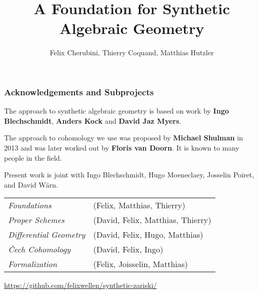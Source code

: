\documentclass{beamer}
\title[ConCoh]
{A Foundation for Synthetic Algebraic Geometry}
\author[Author, Anders] 
{Felix Cherubini, Thierry Coquand, Matthias Hutzler}
\begin{document}
\date{}
\begin{frame}
  \titlepage
\end{frame}

\begin{frame}
  \frametitle{Acknowledgements and Subprojects}
  The approach to synthetic algebraic geometry is based on work by  \textbf{Ingo Blechschmidt}, \textbf{Anders Kock} and \textbf{David Jaz Myers}.

  \pause
  \vspace{0.25cm}
  The approach to cohomology we use was proposed by \textbf{Michael Shulman} in 2013 and was later worked out by \textbf{Floris van Doorn}.
  It is known to many people in the field.

  \pause
  \vspace{0.5cm}
  Present work is joint with
  Ingo Blechschmidt,
  Hugo Moeneclaey,
  Josselin Poiret, and
  David Wärn.

  \vspace{0.25cm}
  \begin{tabular}{lp{7.5cm}}
    \textit{Foundations} & (Felix, Matthias, Thierry) \\
    \textit{Proper Schemes} & (David, Felix, Matthias, Thierry) \\
    \textit{Differential Geometry} & (David, Felix, Hugo, Matthias) \\
    \textit{\v{C}ech Cohomology} & (David, Felix, Ingo) \\
    \textit{Formalization} & (Felix, Joisselin, Matthias) \\
  \end{tabular}

  \vspace{0.25cm}
  \url{https://github.com/felixwellen/synthetic-zariski/}
\end{frame}
\end{document}
